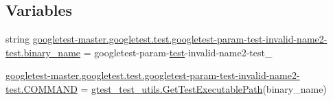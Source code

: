 \subsection*{Variables}
\begin{DoxyCompactItemize}
\item 
string \mbox{\hyperlink{namespacegoogletest-master_1_1googletest_1_1test_1_1googletest-param-test-invalid-name2-test_a4deb61f803e1e11f24a9a8b80b5eba13}{googletest-\/master.\+googletest.\+test.\+googletest-\/param-\/test-\/invalid-\/name2-\/test.\+binary\+\_\+name}} = \textquotesingle{}googletest-\/param-\/\mbox{\hyperlink{_mutual_8h_a707ee03719e99670bf6cfdfd897b8456}{test}}-\/invalid-\/name2-\/test\+\_\+\textquotesingle{}
\item 
\mbox{\hyperlink{namespacegoogletest-master_1_1googletest_1_1test_1_1googletest-param-test-invalid-name2-test_a7525b00697d99622d0a6d23c192d5444}{googletest-\/master.\+googletest.\+test.\+googletest-\/param-\/test-\/invalid-\/name2-\/test.\+C\+O\+M\+M\+A\+ND}} = \mbox{\hyperlink{namespacegtest__test__utils_a89ed3717984a80ffbb7a9c92f71b86a2}{gtest\+\_\+test\+\_\+utils.\+Get\+Test\+Executable\+Path}}(binary\+\_\+name)
\end{DoxyCompactItemize}
